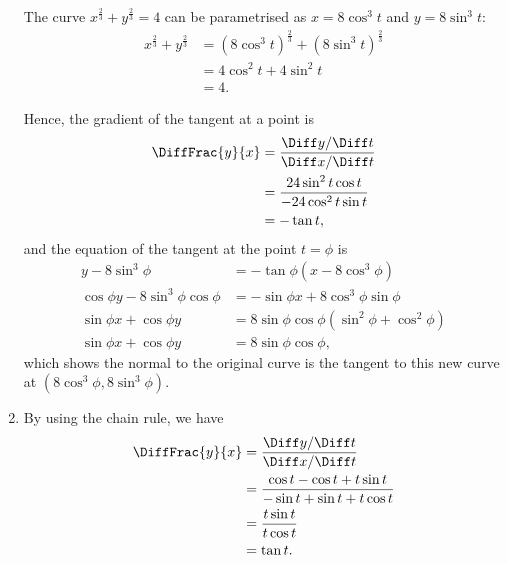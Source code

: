 \begin{enumerate}
          The curve \(x^{\frac{2}{3}} + y^{\frac{2}{3}} = 4\) can be parametrised as \(x = 8 \cos^3 t\) and \(y = 8 \sin^3 t\):
          \begin{align*}
              x^{\frac{2}{3}} + y^{\frac{2}{3}} & = \left(8 \cos^3 t\right)^{\frac{2}{3}} + \left(8 \sin^3 t\right)^{\frac{2}{3}} \\
                                                & = 4 \cos^2 t + 4 \sin^2 t                                                       \\
                                                & = 4.
          \end{align*}

          Hence, the gradient of the tangent at a point is
          \begin{align*}
              \DiffFrac{y}{x} & = \frac{\Diff y / \Diff t}{\Diff x / \Diff t}    \\
                              & = \frac{24 \sin^2 t \cos t}{-24 \cos^2 t \sin t} \\
                              & = - \tan t,
          \end{align*}
          and the equation of the tangent at the point \(t = \phi\) is
          \begin{align*}
              y - 8 \sin^3 \phi                     & = - \tan \phi \left(x - 8 \cos^3 \phi\right)                   \\
              \cos \phi y - 8 \sin^3 \phi \cos \phi & = - \sin \phi x + 8 \cos^3 \phi \sin \phi                      \\
              \sin \phi x + \cos \phi y             & = 8 \sin \phi \cos \phi \left(\sin^2 \phi + \cos^2 \phi\right) \\
              \sin \phi x + \cos \phi y             & = 8 \sin \phi \cos \phi,
          \end{align*}
          which shows the normal to the original curve is the tangent to this new curve at \((8 \cos^3 \phi, 8 \sin^3 \phi)\).

    \item By using the chain rule, we have
          \begin{align*}
              \DiffFrac{y}{x} & = \frac{\Diff y / \Diff t}{\Diff x / \Diff t}                     \\
                              & = \frac{\cos t - \cos t + t \sin t}{- \sin t + \sin t + t \cos t} \\
                              & = \frac{t \sin t}{t \cos t}                                       \\
                              & = \tan t.
          \end{align*}


\end{enumerate}

